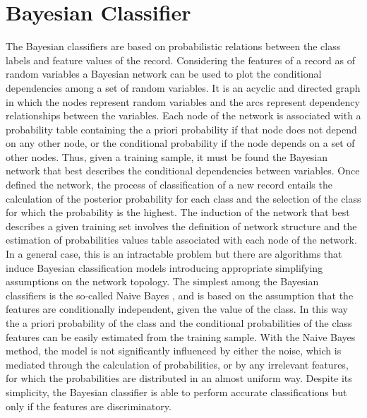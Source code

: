 \documentclass[final,a4paper,12pt,english]{UnicaPhdThesis3}
\begin{document}
	\section{Bayesian Classifier} \label{NB}
	The Bayesian classifiers are based on probabilistic relations between the class labels and feature values of the record. Considering the features of a record as of random variables a Bayesian network can be used to plot the conditional dependencies among a set of random variables. It is an acyclic and directed graph in which the nodes represent random variables and the arcs represent dependency relationships between the variables. Each node of the network is associated with a probability table containing the a priori probability if that node does not depend on any other node, or the conditional probability if the node depends on a set of other nodes. Thus, given a training sample, it must be found the Bayesian network that best describes the conditional dependencies between variables. Once defined the network, the process of classification of a new record entails the calculation of the posterior probability for each class and the selection of the class for which the probability is the highest. The induction of the network that best describes a given training set involves the definition of network structure and the estimation of probabilities values table associated with each node of the network. In a general case, this is an intractable problem but there are algorithms that induce Bayesian classification models introducing appropriate simplifying assumptions on the network topology. The simplest among the Bayesian classifiers is the so-called Naive Bayes  \cite{Duda}, \cite{Langley} and is based on the assumption that the features are conditionally independent, given the value of the class. In this way the a priori probability of the class and the conditional probabilities of the class features can be easily estimated from the training sample. With the Naive Bayes method, the model is not significantly influenced by either the noise, which is mediated through the calculation of probabilities, or by any irrelevant features, for which the probabilities are distributed in an almost uniform way. Despite its simplicity, the Bayesian classifier is able to perform accurate classifications but only if the features are discriminatory.
	
\end{document}
